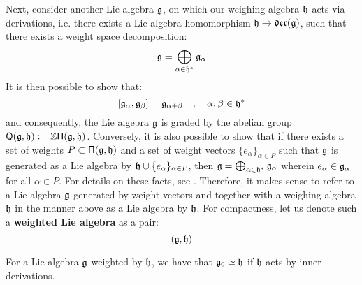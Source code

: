         Next, consider another Lie algebra $\mathfrak{g}$, on which our weighing algebra $\mathfrak{h}$ acts via derivations, i.e. there exists a Lie algebra homomorphism $\mathfrak{h} \to \mathfrak{der}(\mathfrak{g})$, such that there exists a weight space decomposition:
            $$\mathfrak{g} = \bigoplus_{\alpha \in \mathfrak{h}^*} \mathfrak{g}_{\alpha}$$
        It is then possible to show that:
            $$[\mathfrak{g}_{\alpha}, \mathfrak{g}_{\beta}] = \mathfrak{g}_{\alpha + \beta} \quad, \quad \alpha, \beta \in \mathfrak{h}^*$$
        and consequently, the Lie algebra $\mathfrak{g}$ is graded by the abelian group $\mathsf{Q}(\mathfrak{g}, \mathfrak{h}) := \mathbb{Z}\mathsf{\Pi}(\mathfrak{g}, \mathfrak{h})$. Conversely, it is also possible to show that if there exists a set of weights $P \subset \mathsf{\Pi}(\mathfrak{g}, \mathfrak{h})$ and a set of weight vectors $\{ e_{\alpha} \}_{\alpha \in P}$ such that $\mathfrak{g}$ is generated as a Lie algebra by $\mathfrak{h} \cup \{ e_{\alpha} \}_{\alpha \in P}$, then $\mathfrak{g} = \bigoplus_{\alpha \in \mathfrak{h}^*} \mathfrak{g}_{\alpha}$ wherein $e_{\alpha} \in \mathfrak{g}_{\alpha}$ for all $\alpha \in P$. For details on these facts, see \cite[Subsection 2.1, Proposition 2]{moody_pianzola_lie_algebras_with_triangular_decompositions}. Therefore, it makes sense to refer to a Lie algebra $\mathfrak{g}$ generated by weight vectors and together with a weighing algebra $\mathfrak{h}$ in the manner above as a Lie algebra  by $\mathfrak{h}$. For compactness, let us denote such a \textbf{weighted Lie algebra} as a pair:
            $$(\mathfrak{g}, \mathfrak{h})$$
        \begin{remark}
            For a Lie algebra $\mathfrak{g}$ weighted by $\mathfrak{h}$, we have that $\mathfrak{g}_0 \simeq \mathfrak{h}$ if $\mathfrak{h}$ acts by inner derivations.
        \end{remark}

